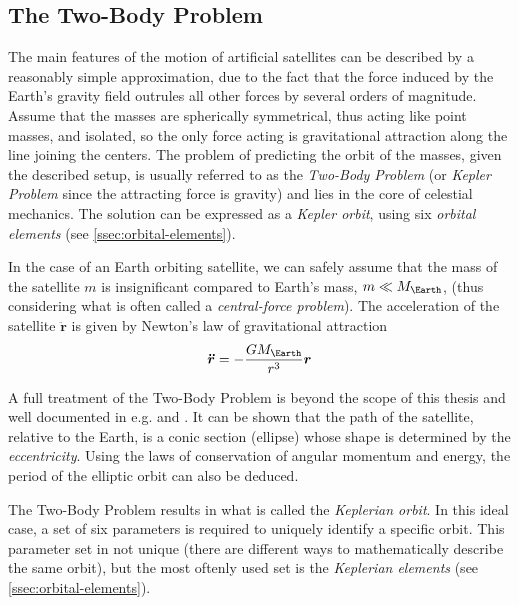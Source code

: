 \subsection{The Two-Body Problem}
\label{ssec:two-body-problem}

The main features of the motion of artificial satellites can be described by a
reasonably simple approximation, due to the fact that the force induced by the 
Earth's gravity field outrules all other forces by several orders of magnitude. 
Assume that the masses are spherically symmetrical, thus acting like point masses, 
and isolated, so the only force acting is gravitational attraction along the line 
joining the centers. The problem of predicting the orbit of the masses, given the 
described setup, is usually referred to as the \emph{Two-Body Problem} (or 
\emph{Kepler Problem} since the attracting force is gravity) and lies in the core 
of celestial mechanics. The solution can be expressed as a \emph{Kepler orbit}, using 
six \emph{orbital elements} (see \autoref{ssec:orbital-elements}).

In the case of an Earth orbiting satellite, we can safely assume that the mass of 
the satellite $m$ is insignificant compared to Earth's mass, $m \ll M_{\Earth}$, 
(thus considering what is often called a \emph{central-force problem}). The 
acceleration of the satellite $\bm{\ddot{r}}$ is given by Newton's law of gravitational 
attraction
\begin{equation}
  \label{eq:mont32}
  \bm{\ddot{r}} = - \frac{G M_{\Earth}}{r^3} \bm{r}
\end{equation}

A full treatment of the Two-Body Problem is beyond the scope of this thesis and 
well documented in e.g. \cite{curtisb} and \cite{chobotov}. It can be shown that 
the path of the satellite, relative to the Earth, is a conic section 
(ellipse) whose shape is determined by the \emph{eccentricity}. Using the laws 
of conservation of angular momentum and energy, the period of the elliptic orbit 
can also be deduced.

The Two-Body Problem results in what is called the \emph{Keplerian orbit}.
In this ideal case, a set of six parameters is required to uniquely identify a specific 
orbit. This parameter set in not unique (there are different ways to mathematically 
describe the same orbit), but the most oftenly used set is the \emph{Keplerian elements} 
(see \autoref{ssec:orbital-elements}).